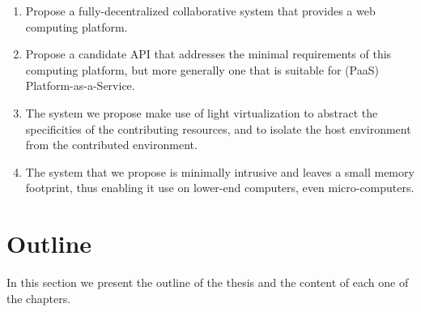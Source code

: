 \documentclass[12pt, titlepage]{uo_temp}
\begin{document}
     \begin{enumerate}[label={\bf Contribution \arabic*}, 
                       wide=\parindent,
                       leftmargin=\parindent, 
                       rightmargin=\parindent]
     \item Propose a fully-decentralized collaborative system that provides a web
       computing platform.
     \item Propose a candidate API that addresses the minimal requirements of this
       computing platform, but more generally one that is suitable for (PaaS)
       Platform-as-a-Service.
     \item The system we propose make use of light virtualization to abstract the
       specificities of the contributing resources, and to isolate the host environment
       from the contributed environment.
     \item The system that we propose is minimally intrusive and leaves a small memory
       footprint, thus enabling it use on lower-end computers, even micro-computers.
     \end{enumerate}
     
     \section{Outline}

     In this section we present the outline of the thesis and the content of each one of
     the chapters.
\end{document}

